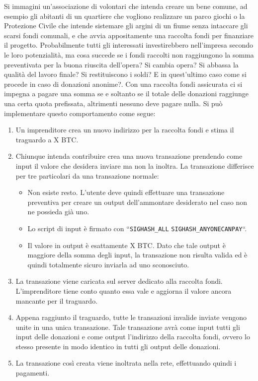 Si immagini un'associazione di volontari che intenda creare un bene comune, ad esempio gli abitanti di un quartiere che vogliono realizzare un parco giochi o la Protezione Civile che intende sistemare gli argini di un fiume senza intaccare gli scarsi fondi comunali, e che avvia appositamente una raccolta fondi per finanziare il progetto. Probabilmente tutti gli interessati investirebbero nell'impresa secondo le loro potenzialità, ma cosa succede se i fondi raccolti non raggiungono la somma preventivata per la buona riuscita dell'opera? Si cambia opera? Si abbassa la qualità del lavoro finale? Si restituiscono i soldi? E in quest'ultimo caso come si procede in caso di donazioni anonime?.
Con una raccolta fondi assicurata ci si impegna a pagare una somma se e soltanto se il totale delle donazioni raggiunge una certa quota prefissata, altrimenti nessuno deve pagare nulla.
Si può implementare questo comportamento come segue:
\begin{enumerate}
    \item Un imprenditore crea un nuovo indirizzo per la raccolta fondi e stima il traguardo a X BTC.
    \item Chiunque intenda contribuire crea una nuova transazione prendendo come input il valore che desidera inviare ma non la inoltra. La transazione differisce per tre particolari da una transazione normale: \begin{itemize}
        \item Non esiste resto. L'utente deve quindi effettuare una transazione preventiva per creare un output dell'ammontare desiderato nel caso non ne possieda già uno.
        \item Lo script di input è firmato con ``\verb|SIGHASH_ALL| \| \verb|SIGHASH_ANYONECANPAY|``.
        \item Il valore in output è esattamente X BTC. Dato che tale output è maggiore della somma degli input, la transazione non risulta valida ed è quindi totalmente sicuro inviarla ad uno sconosciuto.
    \end{itemize}
    \item La transazione viene caricata sul server dedicato alla raccolta fondi. L'imprenditore tiene conto quanto essa vale e aggiorna il valore ancora mancante per il traguardo.
    \item Appena raggiunto il traguardo, tutte le transazioni invalide inviate vengono unite in una unica transazione. Tale transazione avrà come input tutti gli input delle donazioni e come output l'indirizzo della raccolta fondi, ovvero lo stesso presente in modo identico in tutti gli output delle donazioni.
    \item La transazione così creata viene inoltrata nella rete, effettuando quindi i pagamenti.
\end{enumerate}
